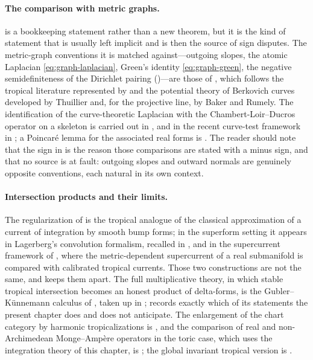 \paragraph{The comparison with metric graphs.}
 is a bookkeeping statement rather than a new
theorem, but it is the kind of statement that is usually left implicit and
is then the source of sign disputes.  The metric-graph conventions it is
matched against---outgoing slopes, the atomic Laplacian
\eqref{eq:graph-laplacian}, Green's identity \eqref{eq:graph-green}, the
negative semidefiniteness of the Dirichlet pairing
()---are those of ,
which follows the tropical literature represented by
\cite{MR18Tropical} and the potential theory of Berkovich curves developed
by Thuillier and, for the projective line, by Baker and Rumely.  The
identification of the curve-theoretic Laplacian with the
Chambert-Loir--Ducros operator on a skeleton is carried out in
\cite{Wanner19}, and in the recent curve-test framework in
\cite{GR25PL,GR25Classical}; a Poincar\'e lemma for the associated real
forms is \cite{Jell16}.  The reader should note that the sign in
 is the reason those comparisons are stated with
a minus sign, and that no source is at fault: outgoing slopes and outward
normals are genuinely opposite conventions, each natural in its own context.

\paragraph{Intersection products and their limits.}
The regularization of  is the tropical
analogue of the classical approximation of a current of integration by
smooth bump forms; in the superform setting it appears in Lagerberg's
convolution formalism, recalled in \cite[\S1.6]{CLD25}, and in the
supercurrent framework of \cite{Ber19Super}, where the metric-dependent
supercurrent of a real submanifold is compared with calibrated tropical
currents.  Those two constructions are not the same, and
 keeps them apart.  The full multiplicative theory,
in which stable tropical intersection becomes an honest product of
delta-forms, is the Gubler--K\"unnemann calculus of \cite{GK17,GK19}, taken
up in ;  records
exactly which of its statements the present chapter does and does not
anticipate.  The enlargement of the chart category by harmonic
tropicalizations is \cite{GJR26}, and the comparison of real and
non-Archimedean Monge--Amp\`ere operators in the toric case, which uses the
integration theory of this chapter, is \cite{Vil20}; the global invariant
tropical version is \cite{BGJKK25}.

